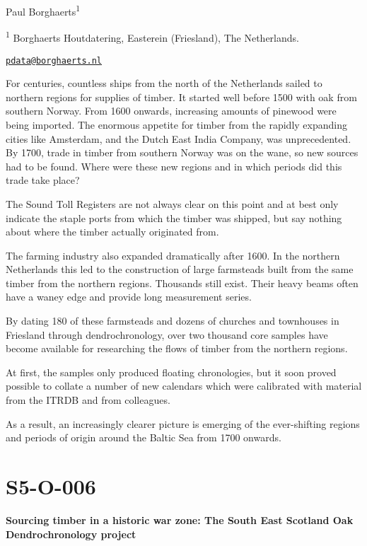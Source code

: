 \documentclass[
]{book}
\begin{document}
Paul Borghaerts\textsuperscript{1}

\textsuperscript{1} Borghaerts Houtdatering, Easterein (Friesland), The Netherlands.

\href{mailto:pdata@borghaerts.nl}{\nolinkurl{pdata@borghaerts.nl}}

For centuries, countless ships from the north of the Netherlands sailed to northern regions for supplies of timber. It started well before 1500 with oak from southern Norway. From 1600 onwards, increasing amounts of pinewood were being imported. The enormous appetite for timber from the rapidly expanding cities like Amsterdam, and the Dutch East India Company, was unprecedented. By 1700, trade in timber from southern Norway was on the wane, so new sources had to be found. Where were these new regions and in which periods did this trade take place?

The Sound Toll Registers are not always clear on this point and at best only indicate the staple ports from which the timber was shipped, but say nothing about where the timber actually originated from.

The farming industry also expanded dramatically after 1600. In the northern Netherlands this led to the construction of large farmsteads built from the same timber from the northern regions. Thousands still exist. Their heavy beams often have a waney edge and provide long measurement series.

By dating 180 of these farmsteads and dozens of churches and townhouses in Friesland through dendrochronology, over two thousand core samples have become available for researching the flows of timber from the northern regions.

At first, the samples only produced floating chronologies, but it soon proved possible to collate a number of new calendars which were calibrated with material from the ITRDB and from colleagues.

As a result, an increasingly clearer picture is emerging of the ever-shifting regions and periods of origin around the Baltic Sea from 1700 onwards.

\hypertarget{s5-o-006}{%
\section*{S5-O-006}\label{s5-o-006}}

\textbf{Sourcing timber in a historic war zone: The South East Scotland Oak Dendrochronology project}
\end{document}
